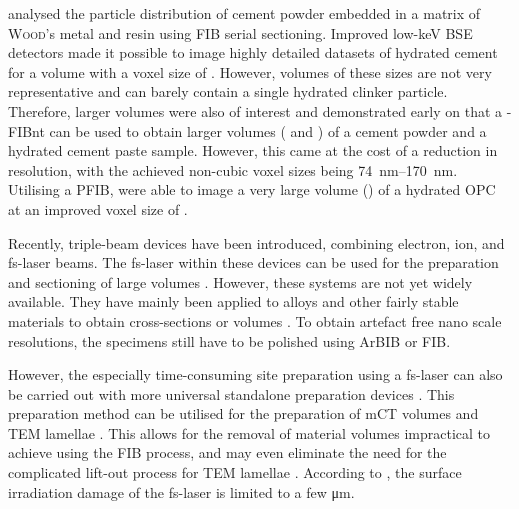 \textcite{holzer.2006, munch.2006} analysed the particle distribution of cement powder embedded in a matrix of \textsc{Wood}'s metal and resin using \ac{FIB} serial sectioning.
Improved low-keV \ac{BSE} detectors made it possible to image highly detailed datasets of hydrated cement for a  volume with a voxel size of  \cite{trtik.2011}.
However, volumes of these sizes are not very representative and can barely contain a single hydrated clinker particle.
Therefore, larger volumes were also of interest and \textcite{munch.2006, holzer.2006a} demonstrated early on that a -\ac{FIBnt} can be used to obtain larger volumes ( and ) of a cement powder and a hydrated cement paste sample.
However, this came at the cost of a reduction in resolution, with the achieved non-cubic voxel sizes being \qtyrange{74}{170}{\nano\meter}.
Utilising a \ac{PFIB}, \textcite{dong.2022} were able to image a very large volume () of a hydrated \ac{OPC} at an improved voxel size of .

Recently, triple-beam devices have been introduced, combining electron, ion, and \ac{fs-laser} beams.
The \ac{fs-laser} within these devices can be used for the preparation and sectioning of large volumes \cite{gholinia.2024}.
However, these systems are not yet widely available.
They have mainly been applied to alloys and other fairly stable materials to obtain cross-sections or volumes \cite{gholinia.2024}.
To obtain artefact free nano scale resolutions, the specimens still have to be polished using \ac{ArBIB} or \ac{FIB}.

However, the especially time-consuming site preparation using a \ac{fs-laser} can also be carried out with more universal standalone preparation devices \cite{hoche.2015}.
This preparation method can be utilised for the preparation of \ac{mCT} volumes \cite{krause.2023} and \ac{TEM} lamellae \cite{tkadletz.2024}.
This allows for the removal of material volumes impractical to achieve using the \ac{FIB} process, and may even eliminate the need for the complicated lift-out process for \ac{TEM} lamellae \cite{tkadletz.2024}.
According to \textcite{hoche.2015}, the surface irradiation damage of the \ac{fs-laser} is limited to a few \unit{\micro\meter}.



